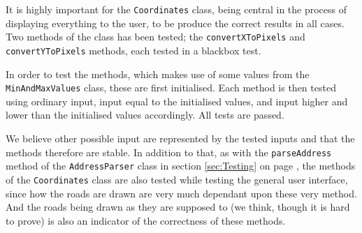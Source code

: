 It is highly important for the \texttt{Coordinates} class, being central in the process of displaying everything to the user, to be produce the correct results in all cases. Two methods of the class has been tested; the \texttt{convertXToPixels} and \texttt{convertYToPixels} methods, each tested in a blackbox test.

In order to test the methods, which makes use of some values from the \texttt{MinAndMaxValues} class, these are first initialised. Each method is then tested  using ordinary input, input equal to the initialised values, and input higher and lower than the initialised values accordingly. All tests are passed.

We believe other possible input are represented by the tested inputs and that the methods therefore are stable. In addition to that, as with the \texttt{parseAddress} method of the \texttt{AddressParser} class in section \ref{sec:Testing} on page \pageref{sec:Testing}, the methods of the \texttt{Coordinates} class are also tested while testing the general user interface, since how the roads are drawn are very much dependant upon these very method. And the roads being drawn as they are supposed to (we think, though it is hard to prove) is also an indicator of the correctness of these methods.